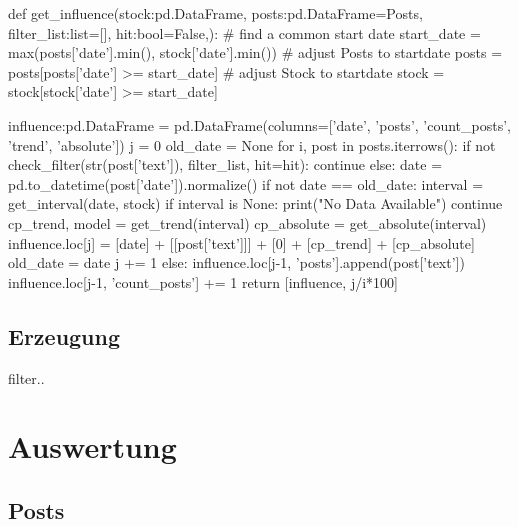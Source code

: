 \documentclass{article}
\begin{document}
\begin{python}
def get_influence(stock:pd.DataFrame, posts:pd.DataFrame=Posts, filter_list:list=[], hit:bool=False,):
    # find a common start date
    start_date = max(posts['date'].min(), stock['date'].min())
    # adjust Posts to startdate
    posts = posts[posts['date'] >= start_date]
    # adjust Stock to startdate
    stock = stock[stock['date'] >= start_date]

    influence:pd.DataFrame = pd.DataFrame(columns=['date', 'posts', 'count_posts', 'trend', 'absolute'])
    j = 0
    old_date = None
    for i, post in posts.iterrows():
        if not check_filter(str(post['text']), filter_list, hit=hit):
            continue
        else:
            date = pd.to_datetime(post['date']).normalize()
            if not date == old_date:
                interval = get_interval(date, stock)
                if interval is None:
                    print("No Data Available")
                    continue
                cp_trend, model = get_trend(interval)
                cp_absolute = get_absolute(interval)
                influence.loc[j] = [date] + [[post['text']]] + [0] + [cp_trend] + [cp_absolute]
                old_date = date
                j += 1
            else:
                influence.loc[j-1, 'posts'].append(post['text'])
                influence.loc[j-1, 'count_posts'] += 1
    return [influence, j/i*100]
\end{python}

\subsection{Erzeugung}
filter..


\newpage

\section{Auswertung}
\subsection{Posts}
\end{document}
